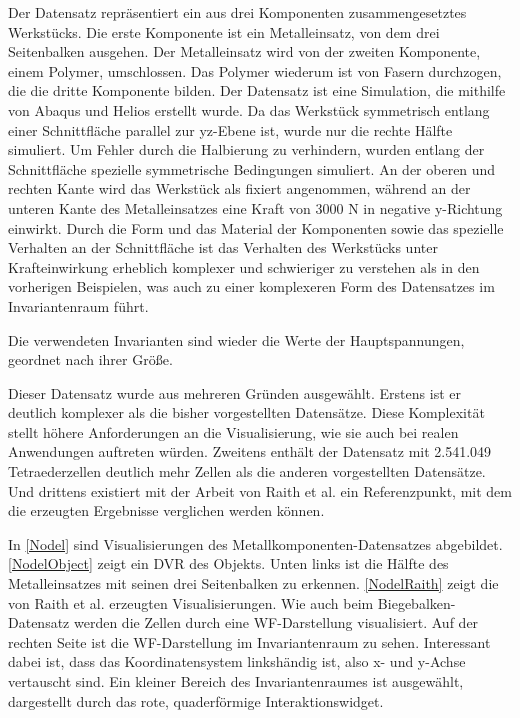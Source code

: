 \documentclass[a4paper,fontsize=12pt,toc=bib,parskip=half,ngerman]{scrartcl}
\begin{document}
Der Datensatz repr\"asentiert ein aus drei Komponenten zusammengesetztes Werkst\"ucks. Die erste Komponente ist ein Metalleinsatz, von dem drei Seitenbalken ausgehen. Der Metalleinsatz wird von der zweiten Komponente, einem Polymer, umschlossen. Das Polymer wiederum ist von Fasern durchzogen, die die dritte Komponente bilden. Der Datensatz ist eine Simulation, die mithilfe von Abaqus\cite{abaqusWebsite} und Helios\cite{heliosWebsite} erstellt wurde. Da das Werkst\"uck symmetrisch entlang einer Schnittfl\"ache parallel zur yz-Ebene ist, wurde nur die rechte H\"alfte simuliert. Um Fehler durch die Halbierung zu verhindern, wurden entlang der Schnittfl\"ache spezielle symmetrische Bedingungen simuliert. An der oberen und rechten Kante wird das Werkst\"uck als fixiert angenommen, w\"ahrend an der unteren Kante des Metalleinsatzes eine Kraft von 3000 N in negative y-Richtung einwirkt. Durch die Form und das Material der Komponenten sowie das spezielle Verhalten an der Schnittfl\"ache ist das Verhalten des Werkst\"ucks unter Krafteinwirkung erheblich komplexer und schwieriger zu verstehen als in den vorherigen Beispielen, was auch zu einer komplexeren Form des Datensatzes im Invariantenraum f\"uhrt. 

Die verwendeten Invarianten sind wieder die Werte der Hauptspannungen, geordnet nach ihrer Gr\"o{\ss}e.

Dieser Datensatz wurde aus mehreren Gr\"unden ausgew\"ahlt. Erstens ist er deutlich komplexer als die bisher vorgestellten Datens\"atze. Diese Komplexit\"at stellt h\"ohere Anforderungen an die Visualisierung, wie sie auch bei realen Anwendungen auftreten w\"urden. Zweitens enth\"alt der Datensatz mit 2.541.049 Tetraederzellen deutlich mehr Zellen als die anderen vorgestellten Datens\"atze. Und drittens existiert mit der Arbeit von Raith et al. ein Referenzpunkt, mit dem die erzeugten Ergebnisse verglichen werden k\"onnen.

In \cref{Nodel} sind Visualisierungen des Metallkomponenten-Datensatzes abgebildet. \linebreak \cref{NodelObject} zeigt ein DVR des Objekts. Unten links ist die H\"alfte des Metalleinsatzes mit seinen drei Seitenbalken zu erkennen. \cref{NodelRaith} zeigt die von Raith et al. erzeugten Visualisierungen. Wie auch beim Biegebalken-Datensatz werden die Zellen durch eine WF-Darstellung visualisiert. Auf der rechten Seite ist die WF-Darstellung im Invariantenraum zu sehen. Interessant dabei ist, dass das Koordinatensystem linksh\"andig ist, also x- und y-Achse vertauscht sind. Ein kleiner Bereich des Invariantenraumes ist ausgew\"ahlt, dargestellt durch das rote, quaderf\"ormige Interaktionswidget. 
\end{document}

